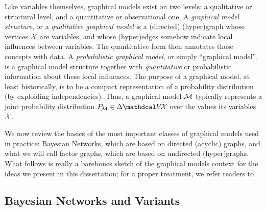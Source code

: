 Like variables themselves, graphical models exist on two levels: a qualitative or structural level, and a quantitative or observational one.
%
A \emph{graphical model structure}, or a \emph{qualitative graphical model} is a (directed) (hyper)graph whose vertices $\mathcal X$ are variables, and whose (hyper)edges somehow indicate local influences between variables.
The quantitative form then annotates those concepts with data.
A \emph{probabilistic graphical model},
or simply  ``graphical model'', is a
graphical model structure together with  \emph{quantitative} or probabilistic information about these local influences.
%
The purpose of a graphical model, at least historically, is to be a compact representation of a probability distribution (by exploiding independencies). 
Thus, a graphical model $\cal M$
typically represents a joint probability distribution $\Pr_{\!\cal M}
 \in \Delta \V\!\X$ over the values its variables $\mathcal X$.

We now review the basics of the most important classes of graphical models used in practice:
Bayesian Networks, which are based on directed (acyclic) graphs, and
what we will call factor graphs, which are based on undirected (hyper)graphs. 
What follows is really a barebones sketch of the graphical models context for the ideas we present in this dissertation; for a proper treatment, we refer readers to 
    \citet{KF09}.
    
\subsection{Bayesian Networks and Variants}
    \label{sec:prelim-bns}

